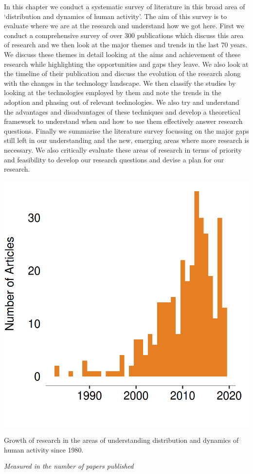 In this chapter we conduct a systematic survey of literature in this broad area of `distribution and dynamics of human activity'.
The aim of this survey is to evaluate where we are at the research and understand how we got here.
First we conduct a comprehensive survey of over 300 publications which discuss this area of research and we then look at the major themes and trends in the last 70 years.
We discuss these themes in detail looking at the aims and achievement of these research while highlighting the opportunities and gaps they leave.
We also look at the timeline of their publication and discuss the evolution of the research along with the changes in the technology landscape.
We then classify the studies by looking at the technologies employed by them and note the trends in the adoption and phasing out of relevant technologies.
We also try and understand the advantages and disadvantages of these techniques and develop a theoretical framework to understand when and how to use them effectively answer research questions.
Finally we summarise the literature survey focussing on the major gaps still left in our understanding and the new, emerging areas where more research is necessary.
We also critically evaluate these areas of research in terms of priority and feasibility to develop our research questions and devise a plan for our research. 

\begin{marginfigure}
  \includegraphics{images/literature-timeline.png}
  \caption{Growth of research in the areas of understanding distribution and dynamics of human activity since 1980.}
  \label{figure:literature:timeline}
  \vspace{1em}
  \noindent\fontsize{7}{7}\textit{Measured in the number of papers published}
\end{marginfigure}


